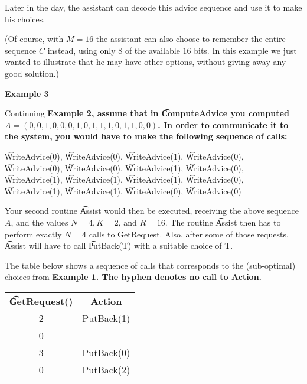 Later in the day, the assistant can decode this advice sequence and use it to make his choices.

(Of course, with $M = 16$ the assistant can also choose to remember the entire sequence $C$ instead, using only $8$ of the available $16$ bits. In this example we just wanted to illustrate that he may have other options, without giving away any good solution.)

\bf{Example 3}

Continuing \bf{Example 2}, assume that in \t{ComputeAdvice} you computed $A = (0, 0, 1, 0, 0, 0, 1, 0, 1, 1, 1, 0, 1, 1, 0, 0)$. In order to communicate it to the system, you would have to make the following sequence of calls: 

\t{WriteAdvice(0)}, \t{WriteAdvice(0)}, \t{WriteAdvice(1)}, \t{WriteAdvice(0)}, \t{WriteAdvice(0)}, \t{WriteAdvice(0)}, \t{WriteAdvice(1)}, \t{WriteAdvice(0)}, \t{WriteAdvice(1)}, \t{WriteAdvice(1)}, \t{WriteAdvice(1)}, \t{WriteAdvice(0)}, \t{WriteAdvice(1)}, \t{WriteAdvice(1)}, \t{WriteAdvice(0)}, \t{WriteAdvice(0)}

Your second routine \t{Assist} would then be executed, receiving the above sequence $A$, and the values $N = 4, K = 2$, and $R = 16$. The routine \t{Assist} then has to perform exactly $N = 4$ calls to GetRequest. Also, after some of those requests, \t{Assist} will have to call \t{PutBack(T)} with a suitable choice of T.

The table below shows a sequence of calls that corresponds to the (sub-optimal) choices from \bf{Example 1}. The hyphen denotes no call to Action.

\begin{tabular}{cc}
\bf{\t{GetRequest()}}&\bf{Action}\\
2 &PutBack(1)\\
0 &-\\
3 &PutBack(0)\\
0 &PutBack(2)\\
\end{tabular}
